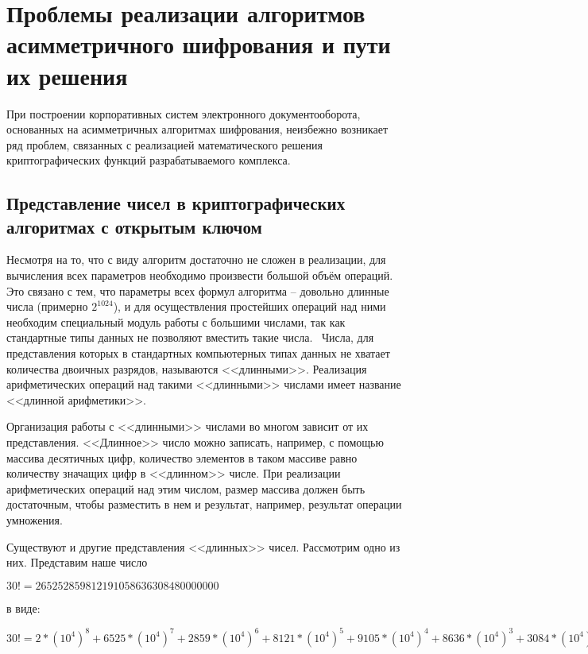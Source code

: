 \section{Проблемы реализации алгоритмов асимметричного шифрования и пути их
решения}

При построении корпоративных систем электронного документооборота, основанных на
асимметричных алгоритмах шифрования, неизбежно возникает ряд проблем, связанных
с реализацией математического решения криптографических функций разрабатываемого
комплекса.

\subsection{Представление чисел в криптографических алгоритмах с открытым
ключом} 

Несмотря на то, что с виду алгоритм достаточно не сложен в реализации,
для вычисления всех параметров необходимо произвести большой объём операций. Это
связано с тем, что параметры всех формул алгоритма -- довольно  длинные числа
(примерно $ 2^{1024} $), и для осуществления простейших операций над ними
необходим специальный модуль работы  с  большими числами, так как стандартные типы данных
не позволяют вместить такие числа.~\cite{ECP}
Числа, для представления которых в стандартных компьютерных типах данных не
хватает количества двоичных разрядов, называются <<длинными>>. Реализация
арифметических операций над такими <<длинными>> числами имеет название <<длинной
арифметики>>.

Организация работы с <<длинными>> числами во многом зависит от их представления.
<<Длинное>> число можно записать, например, с помощью массива десятичных цифр,
количество элементов в таком массиве равно количеству значащих цифр в
<<длинном>> числе. При реализации арифметических операций над этим числом,
размер массива должен быть достаточным, чтобы разместить в нем и результат, например, результат
операции умножения.

Существуют и другие представления <<длинных>> чисел. Рассмотрим одно из них.
Представим наше число
\begin{center}
$30! = 265252859812191058636308480000000$
\end{center} в виде:
\begin{center}
$30! = 2 * (10^4)^8 + 6525 * (10^4)^7 + 2859 * (10^4)^6 + 8121 * (10^4)^5 + 9105
* (10^4)^4 + 8636 * (10^4)^3 + 3084 * (10^4)^2 + 8000 * (10^4)^1 + 0000 *
(10^4)^0$
\end{center}

